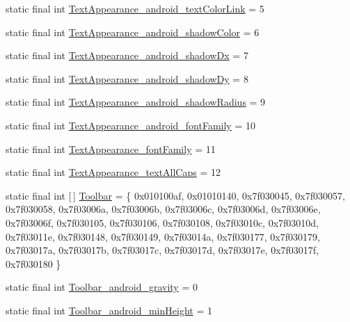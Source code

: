 \begin{DoxyCompactItemize}
\item 
static final int \mbox{\hyperlink{classcom_1_1google_1_1android_1_1gms_1_1R_1_1styleable_ae6a18613f5494560a16540a570d758e1}{Text\+Appearance\+\_\+android\+\_\+text\+Color\+Link}} = 5
\item 
static final int \mbox{\hyperlink{classcom_1_1google_1_1android_1_1gms_1_1R_1_1styleable_a2b1cf072b2570ab3c4cde8f1fe222440}{Text\+Appearance\+\_\+android\+\_\+shadow\+Color}} = 6
\item 
static final int \mbox{\hyperlink{classcom_1_1google_1_1android_1_1gms_1_1R_1_1styleable_a5bb4e94a61485806e4c7ff353b60ee28}{Text\+Appearance\+\_\+android\+\_\+shadow\+Dx}} = 7
\item 
static final int \mbox{\hyperlink{classcom_1_1google_1_1android_1_1gms_1_1R_1_1styleable_ab5e4bdd7ecbf856ad2fc1a194e8c126c}{Text\+Appearance\+\_\+android\+\_\+shadow\+Dy}} = 8
\item 
static final int \mbox{\hyperlink{classcom_1_1google_1_1android_1_1gms_1_1R_1_1styleable_ad1d88dbd0d9f076fcb0797aabc18d7cc}{Text\+Appearance\+\_\+android\+\_\+shadow\+Radius}} = 9
\item 
static final int \mbox{\hyperlink{classcom_1_1google_1_1android_1_1gms_1_1R_1_1styleable_a96cd3144144622f3ddf521e210b18419}{Text\+Appearance\+\_\+android\+\_\+font\+Family}} = 10
\item 
static final int \mbox{\hyperlink{classcom_1_1google_1_1android_1_1gms_1_1R_1_1styleable_a68acc9b484647c2b1dd0a8b1d7ac372f}{Text\+Appearance\+\_\+font\+Family}} = 11
\item 
static final int \mbox{\hyperlink{classcom_1_1google_1_1android_1_1gms_1_1R_1_1styleable_a7f9d1dab2edaf89db489ea1d19fd93ab}{Text\+Appearance\+\_\+text\+All\+Caps}} = 12
\item 
static final int \mbox{[}$\,$\mbox{]} \mbox{\hyperlink{classcom_1_1google_1_1android_1_1gms_1_1R_1_1styleable_acc956142087c373aa9eeafc92e55d84f}{Toolbar}} = \{ 0x010100af, 0x01010140, 0x7f030045, 0x7f030057, 0x7f030058, 0x7f03006a, 0x7f03006b, 0x7f03006c, 0x7f03006d, 0x7f03006e, 0x7f03006f, 0x7f030105, 0x7f030106, 0x7f030108, 0x7f03010c, 0x7f03010d, 0x7f03011e, 0x7f030148, 0x7f030149, 0x7f03014a, 0x7f030177, 0x7f030179, 0x7f03017a, 0x7f03017b, 0x7f03017c, 0x7f03017d, 0x7f03017e, 0x7f03017f, 0x7f030180 \}
\item 
static final int \mbox{\hyperlink{classcom_1_1google_1_1android_1_1gms_1_1R_1_1styleable_a20e802c612be23ded3f16209f0912a1f}{Toolbar\+\_\+android\+\_\+gravity}} = 0
\item 
static final int \mbox{\hyperlink{classcom_1_1google_1_1android_1_1gms_1_1R_1_1styleable_a55b4d1927ae713337f5b0334ffec52e2}{Toolbar\+\_\+android\+\_\+min\+Height}} = 1

\end{DoxyCompactItemize}
